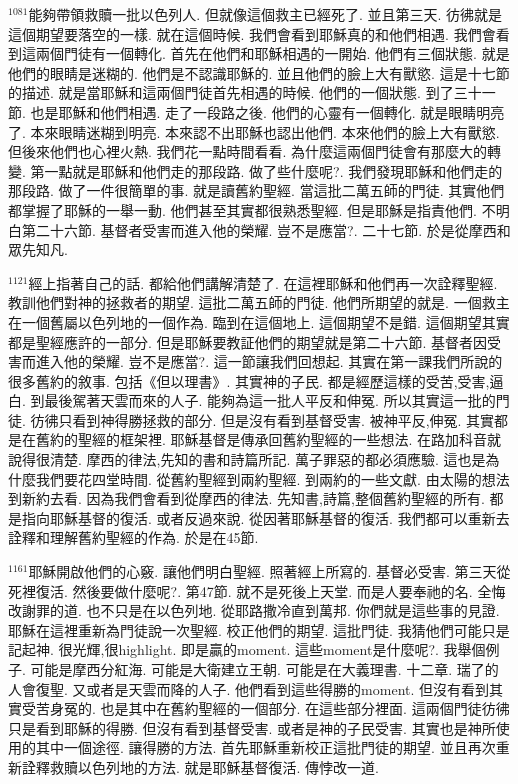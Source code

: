 \documentclass{book}
\begin{document}
$^{1081}$能夠帶領救贖一批以色列人.
但就像這個救主已經死了.
並且第三天.
彷彿就是這個期望要落空的一樣.
就在這個時候.
我們會看到耶穌真的和他們相遇.
我們會看到這兩個門徒有一個轉化.
首先在他們和耶穌相遇的一開始.
他們有三個狀態.
就是他們的眼睛是迷糊的.
他們是不認識耶穌的.
並且他們的臉上大有獸慾.
這是十七節的描述.
就是當耶穌和這兩個門徒首先相遇的時候.
他們的一個狀態.
到了三十一節.
也是耶穌和他們相遇.
走了一段路之後.
他們的心靈有一個轉化.
就是眼睛明亮了.
本來眼睛迷糊到明亮.
本來認不出耶穌也認出他們.
本來他們的臉上大有獸慾.
但後來他們也心裡火熱.
我們花一點時間看看.
為什麼這兩個門徒會有那麼大的轉變.
第一點就是耶穌和他們走的那段路.
做了些什麼呢?.
我們發現耶穌和他們走的那段路.
做了一件很簡單的事.
就是讀舊約聖經.
當這批二萬五師的門徒.
其實他們都掌握了耶穌的一舉一動.
他們甚至其實都很熟悉聖經.
但是耶穌是指責他們.
不明白第二十六節.
基督者受害而進入他的榮耀.
豈不是應當?.
二十七節.
於是從摩西和眾先知凡.

$^{1121}$經上指著自己的話.
都給他們講解清楚了.
在這裡耶穌和他們再一次詮釋聖經.
教訓他們對神的拯救者的期望.
這批二萬五師的門徒.
他們所期望的就是.
一個救主在一個舊屬以色列地的一個作為.
臨到在這個地上.
這個期望不是錯.
這個期望其實都是聖經應許的一部分.
但是耶穌要教証他們的期望就是第二十六節.
基督者因受害而進入他的榮耀.
豈不是應當?.
這一節讓我們回想起.
其實在第一課我們所說的很多舊約的敘事.
包括《但以理書》.
其實神的子民.
都是經歷這樣的受苦,受害,逼白.
到最後駕著天雲而來的人子.
能夠為這一批人平反和伸冤.
所以其實這一批的門徒.
彷彿只看到神得勝拯救的部分.
但是沒有看到基督受害.
被神平反,伸冤.
其實都是在舊約的聖經的框架裡.
耶穌基督是傳承回舊約聖經的一些想法.
在路加科音就說得很清楚.
摩西的律法,先知的書和詩篇所記.
萬子罪惡的都必須應驗.
這也是為什麼我們要花四堂時間.
從舊約聖經到兩約聖經.
到兩約的一些文獻.
由太陽的想法到新約去看.
因為我們會看到從摩西的律法.
先知書,詩篇,整個舊約聖經的所有.
都是指向耶穌基督的復活.
或者反過來說.
從因著耶穌基督的復活.
我們都可以重新去詮釋和理解舊約聖經的作為.
於是在45節.

$^{1161}$耶穌開啟他們的心竅.
讓他們明白聖經.
照著經上所寫的.
基督必受害.
第三天從死裡復活.
然後要做什麼呢?.
第47節.
就不是死後上天堂.
而是人要奉祂的名.
全悔改謝罪的道.
也不只是在以色列地.
從耶路撒冷直到萬邦.
你們就是這些事的見證.
耶穌在這裡重新為門徒說一次聖經.
校正他們的期望.
這批門徒.
我猜他們可能只是記起神.
很光輝,很highlight.
即是贏的moment.
這些moment是什麼呢?.
我舉個例子.
可能是摩西分紅海.
可能是大衛建立王朝.
可能是在大義理書.
十二章.
瑞了的人會復聖.
又或者是天雲而降的人子.
他們看到這些得勝的moment.
但沒有看到其實受苦身冤的.
也是其中在舊約聖經的一個部分.
在這些部分裡面.
這兩個門徒彷彿只是看到耶穌的得勝.
但沒有看到基督受害.
或者是神的子民受害.
其實也是神所使用的其中一個途徑.
讓得勝的方法.
首先耶穌重新校正這批門徒的期望.
並且再次重新詮釋救贖以色列地的方法.
就是耶穌基督復活.
傳悖改一道.
\end{document}
